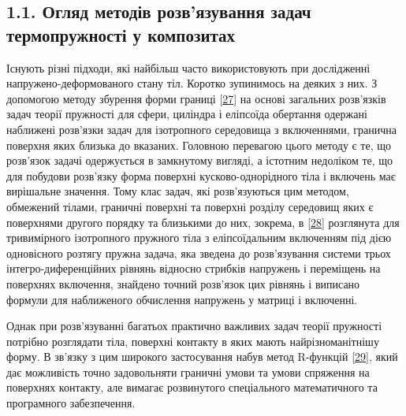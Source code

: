 \hypertarget{ux43eux433ux43bux44fux434-ux43cux435ux442ux43eux434ux456ux432-ux440ux43eux437ux432ux44fux437ux443ux432ux430ux43dux43dux44f-ux437ux430ux434ux430ux447-ux442ux435ux440ux43cux43eux43fux440ux443ux436ux43dux43eux441ux442ux456-ux443-ux43aux43eux43cux43fux43eux437ux438ux442ux430ux445}{%
\subsection[1.1. Огляд методів розв'язування задач термопружності у
композитах]{\texorpdfstring{\protect\hypertarget{anchor-13}{}{}1.1.
Огляд методів розв'язування задач термопружності у
композитах}{1.1. Огляд методів розв'язування задач термопружності у композитах}}\label{ux43eux433ux43bux44fux434-ux43cux435ux442ux43eux434ux456ux432-ux440ux43eux437ux432ux44fux437ux443ux432ux430ux43dux43dux44f-ux437ux430ux434ux430ux447-ux442ux435ux440ux43cux43eux43fux440ux443ux436ux43dux43eux441ux442ux456-ux443-ux43aux43eux43cux43fux43eux437ux438ux442ux430ux445}}

\protect\hypertarget{anchor-14}{}{}Існують різні підходи, які найбільш
часто використовують при дослідженні напружено-деформованого стану тіл.
Коротко зупинимось на деяких з них. З допомогою методу збурення форми
границі {[}\protect\hyperlink{anchor-15}{27}{]} на основі загальних
розв'язків задач теорії пружності для сфери, циліндра і еліпсоїда
обертання одержані наближені розв'язки задач для ізотропного середовища
з включеннями, гранична поверхня яких близька до вказаних. Головною
перевагою цього методу є те, що розв'язок задачі одержується в
замкнутому вигляді, а істотним недоліком те, що для побудови розв'язку
форма поверхні кусково-однорідного тіла і включень має вирішальне
значення. Тому клас задач, які розв'язуються цим методом, обмежений
тілами, граничні поверхні та поверхні розділу середовищ яких є
поверхнями другого порядку та близькими до них, зокрема, в
{[}\protect\hyperlink{anchor-16}{28}{]} розглянута для тривимірного
ізотропного пружного тіла з еліпсоїдальним включенням під дією
одновісного розтягу пружна задача, яка зведена до розв'язування системи
трьох інтегро-диференційних рівнянь відносно стрибків напружень і
переміщень на поверхнях включення, знайдено точний розв'язок цих рівнянь
і виписано формули для наближеного обчислення напружень у матриці і
включенні.

Однак при розв'язуванні багатьох практично важливих задач теорії
пружності потрібно розглядати тіла, поверхні контакту в яких мають
найрізноманітнішу форму. В зв'язку з цим широкого застосування набув
метод R-функцій {[}\protect\hyperlink{anchor-17}{29}{]}, який дає
можливість точно задовольняти граничні умови та умови спряження на
поверхнях контакту, але вимагає розвинутого спеціального математичного
та програмного забезпечення.

